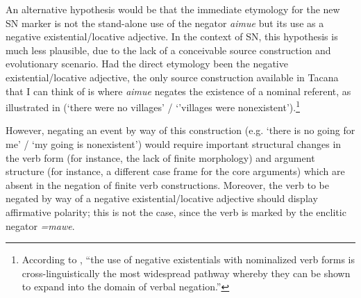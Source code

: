 \documentclass[output=paper,draft,draftmode,colorlinks,citecolor=brown]{langscibook}
\begin{document}
\begin{table}[t]
\caption{Evolutionary pathway of Tacana stand-alone negation \emph{aimue} into the marking of SN}\label{tab:tacana-aimue-pathway}
\end{table}


An alternative hypothesis would be that the immediate etymology for the new
SN marker is not the stand-alone use of the negator \textit{aimue} but its
use as a negative existential\slash locative adjective. In the context of
SN, this hypothesis is much less plausible, due to the lack of a
conceivable source construction and evolutionary scenario. Had the direct
etymology been the negative existential\slash locative adjective, the only
source construction available in Tacana that I can think of is where
\textit{aimue} negates the existence of a nominal referent, as illustrated
in  (`there were no villages' \slash{} `'villages were nonexistent').\footnote{\label{fn:tacana-nominalized}According to \textcite[157]{Veselinova2016}, ``the use of
negative existentials with nominalized verb forms is cross-linguistically
the most widespread pathway whereby they can be shown to expand into the
domain of verbal negation.''}

However, negating an event by way of this construction (e.g. `there
is no going for me' \slash{}  `my going is nonexistent') would require important
structural changes in the verb form (for instance, the lack of finite
morphology) and argument structure (for instance, a different case frame
for the core arguments) which are absent in the negation of finite verb
constructions. Moreover, the verb to be negated by way of a negative
existential\slash locative adjective should display affirmative polarity;
this is not the case, since the verb is marked by the enclitic negator
\textit{=mawe}.
\end{document}
